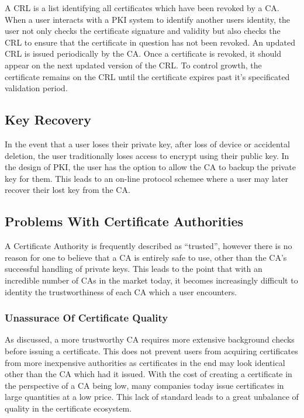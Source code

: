 A CRL is a list identifying all certificates which have been revoked by a CA. When a user interacts with a PKI system to identify another users identity, the user not only checks the certificate signature and validity but also checks the CRL to ensure that the certificate in question has not been revoked. An updated CRL is issued periodically by the CA. Once a certificate is revoked, it should appear on the next updated version of the CRL. To control growth, the certificate remains on the CRL until the certificate expires past it’s specificated validation period.

\subsection{Key Recovery}
In the event that a user loses their private key, after loss of device or accidental deletion, the user traditionally loses access to encrypt using their public key. In the design of PKI, the user has the option to allow the CA to backup the private key for them. This leads to an on-line protocol schemee where a user may later recover their lost key from the CA.


\subsection{Problems With Certificate Authorities}
A Certificate Authority is frequently described as “trusted”, however there is no reason for one to believe that a CA is entirely safe to use, other than the CA’s successful handling of private keys. This leads to the point that with an incredible number of CAs in the market today, it becomes increasingly difficult to identity the trustworthiness of each CA which a user encounters.

\subsubsection{Unassurace Of Certificate Quality}


As discussed, a more trustworthy CA requires more extensive background checks before issuing a certificate. This does not prevent users from acquiring certificates from more inexpensive authorities as certificates in the end may look identical other than the CA which had it issued. With the cost of creating a certificate in the perspective of a CA being low, many companies today issue certificates in large quantities at a low price. This lack of standard leads to a great unbalance of quality in the certificate ecosystem.

